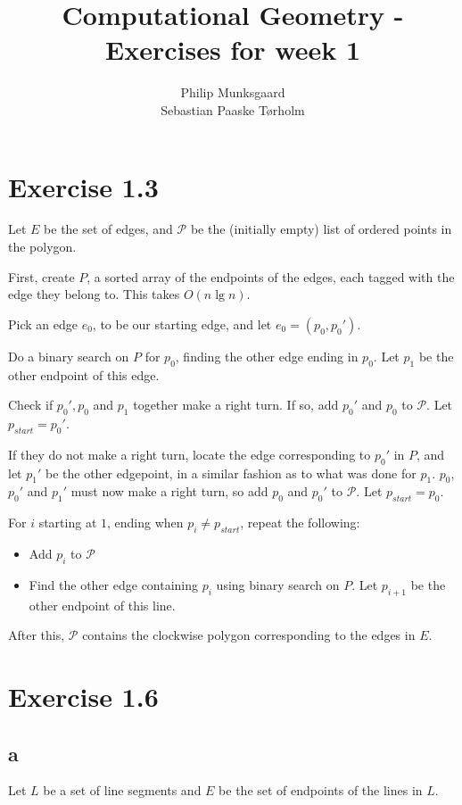 \documentclass[11pt,a4paper]{article}
\title{Computational Geometry - Exercises for week 1}
\author{Philip Munksgaard\\Sebastian Paaske Tørholm}
\begin{document}
\maketitle

\section{Exercise 1.3}
Let $E$ be the set of edges, and $\mathcal{P}$ be the (initially empty) list of
ordered points in the polygon.

First, create $P$, a sorted array of the endpoints of the edges, each tagged
with the edge they belong to. This takes $O(n \lg n)$.

Pick an edge $e_0$, to be our starting edge, and let $e_0 = (p_0, p_0')$.

Do a binary search on $P$ for $p_0$, finding the other edge ending in $p_0$. Let
$p_1$ be the other endpoint of this edge.

Check if $p_0', p_0$ and $p_1$ together make a right turn. If so, add $p_0'$ and
$p_0$ to $\mathcal{P}$. Let $p_{start} = p_0'$.

If they do not make a right turn, locate the edge corresponding to $p_0'$ in
$P$, and let $p_1'$ be the other edgepoint, in a similar fashion as to what
was done for $p_1$. $p_0$, $p_0'$ and $p_1'$ must now make a right turn, so add
$p_0$ and $p_0'$ to $\mathcal{P}$. Let $p_{start} = p_0$.

For $i$ starting at $1$, ending when $p_i \neq p_{start}$, repeat the following: 
\begin{itemize}
    \item Add $p_i$ to $\mathcal{P}$
    \item Find the other edge containing $p_i$ using binary search on $P$. Let $p_{i+1}$
          be the other endpoint of this line.
\end{itemize}

After this, $\mathcal{P}$ contains the clockwise polygon corresponding to the
edges in $E$.

\section{Exercise 1.6}

\subsection{a}
Let $L$ be a set of line segments and $E$ be the set of endpoints of the lines in $L$.
\end{document}
